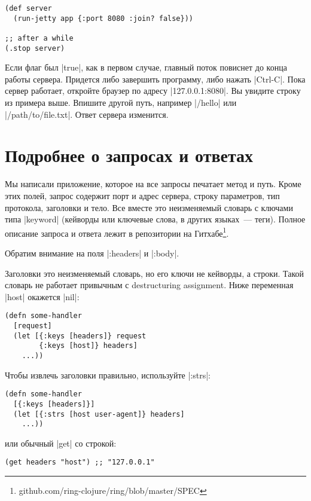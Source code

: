 \begin{verbatim}
(def server
  (run-jetty app {:port 8080 :join? false}))

;; after a while
(.stop server)
\end{verbatim}

Если флаг был \spverb|true|, как в первом случае, главный поток повиснет до
конца работы сервера. Придется либо завершить программу, либо нажать
\spverb|Ctrl-C|. Пока сервер работает, откройте браузер по адресу \spverb|127.0.0.1:8080|.
Вы увидите строку из примера выше. Впишите другой путь, например \spverb|/hello| или
\spverb|/path/to/file.txt|. Ответ сервера изменится.

\section{Подробнее о запросах и ответах}

Мы написали приложение, которое на все запросы печатает метод и путь. Кроме этих
полей, запрос содержит порт и адрес сервера, строку параметров, тип протокола,
заголовки и тело. Все вместе это неизменяемый словарь с ключами типа
\spverb|keyword| (кейворды или ключевые слова, в других языках~--- теги). Полное
описание запроса и ответа лежит в репозитории
на Гитхабе\footnote{github.com/ring-clojure/ring/blob/master/SPEC}.

Обратим внимание на поля \spverb|:headers| и \spverb|:body|.

Заголовки это неизменяемый словарь, но его ключи не кейворды, а строки. Такой
словарь не работает привычным с destructuring assignment. Ниже переменная \spverb|host|
окажется \spverb|nil|:

\begin{verbatim}
(defn some-handler
  [request]
  (let [{:keys [headers]} request
        {:keys [host]} headers]
    ...))
\end{verbatim}

Чтобы извлечь заголовки правильно, используйте \spverb|:strs|:

\begin{verbatim}
(defn some-handler
  [{:keys [headers]}]
  (let [{:strs [host user-agent]} headers]
    ...))
\end{verbatim}

\noindent
или обычный \spverb|get| со строкой:

\begin{verbatim}
(get headers "host") ;; "127.0.0.1"
\end{verbatim}

